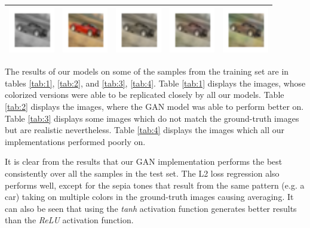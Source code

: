 \documentclass{article}
\begin{document}
\begin{table}[h!]
\begin{tabular}{ccccc}
    \includegraphics[width=2cm]{results3/246-bw.png} & \includegraphics[width=2cm]{results3/246-gt.png} & \includegraphics[width=2cm]{results5/246-relucnn.png} & \includegraphics[width=2cm]{results5/246-tanhcnn.png} & \includegraphics[width=2cm]{results3/246-gan.png} \\
    \bottomrule
  \end{tabular}
\end{table}

The results of our models on some of the samples from the training set are in tables
\ref{tab:1}, \ref{tab:2}, and \ref{tab:3}, \ref{tab:4}. Table \ref{tab:1} displays the
images, whose colorized versions were able to be replicated closely by all our
models. Table \ref{tab:2} displays the images, where the GAN model was able to perform
better on. Table \ref{tab:3} displays some images which do not match the ground-truth
images but are realistic nevertheless. Table \ref{tab:4} displays the images which all
our implementations performed poorly on.

It is clear from the results that our GAN implementation performs the best
consistently over all the samples in the test set. The L2 loss regression also
performs well, except for the sepia tones that result from the same pattern
(e.g. a car) taking on multiple colors in the ground-truth images causing
averaging. It can also be seen that using the \textit{tanh} activation function
generates better results than the \textit{ReLU} activation function.
\end{document}
